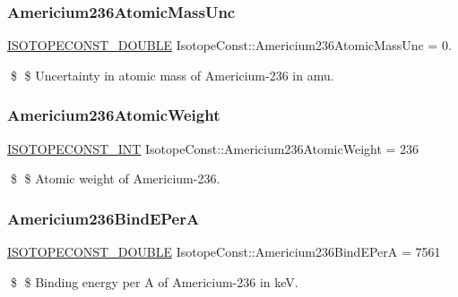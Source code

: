 \subsubsection{\texorpdfstring{Americium236\+Atomic\+Mass\+Unc}{Americium236AtomicMassUnc}}
{\footnotesize\ttfamily \mbox{\hyperlink{group___isotope_const-_macros_ga8f45a7272ce02c0b4c65c44636ed719a}{I\+S\+O\+T\+O\+P\+E\+C\+O\+N\+S\+T\+\_\+\+D\+O\+U\+B\+LE}} Isotope\+Const\+::\+Americium236\+Atomic\+Mass\+Unc = 0.}

\$ \$ Uncertainty in atomic mass of Americium-\/236 in amu. \mbox{\label{group___isotope_const-_americium-_am236_ga891b4f99de01095c796bd4e4e93f6797}} 
\subsubsection{\texorpdfstring{Americium236\+Atomic\+Weight}{Americium236AtomicWeight}}
{\footnotesize\ttfamily \mbox{\hyperlink{group___isotope_const-_macros_ga5f18360b3e99483a35c32d789e62621c}{I\+S\+O\+T\+O\+P\+E\+C\+O\+N\+S\+T\+\_\+\+I\+NT}} Isotope\+Const\+::\+Americium236\+Atomic\+Weight = 236}

\$ \$ Atomic weight of Americium-\/236. \mbox{\label{group___isotope_const-_americium-_am236_ga5e0ac52ef97caf2d646beae3fc6862ca}} 
\subsubsection{\texorpdfstring{Americium236\+Bind\+E\+PerA}{Americium236BindEPerA}}
{\footnotesize\ttfamily \mbox{\hyperlink{group___isotope_const-_macros_ga8f45a7272ce02c0b4c65c44636ed719a}{I\+S\+O\+T\+O\+P\+E\+C\+O\+N\+S\+T\+\_\+\+D\+O\+U\+B\+LE}} Isotope\+Const\+::\+Americium236\+Bind\+E\+PerA = 7561}

\$ \$ Binding energy per A of Americium-\/236 in keV. \mbox{\label{group___isotope_const-_americium-_am236_gad966840d541309f6f096e829040db169}} 
